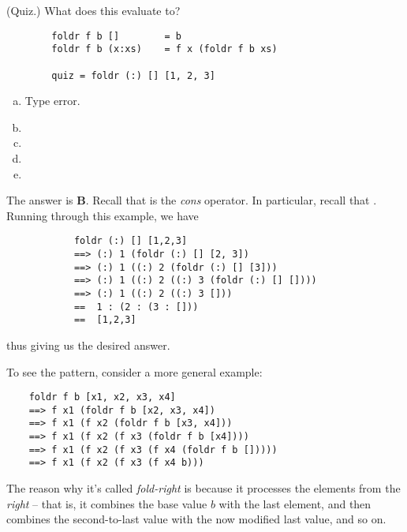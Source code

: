 \documentclass[letterpaper]{article}
\begin{document}
\begin{mdframed}[]
    (Quiz.) What does this evaluate to? 
    \begin{verbatim}
        foldr f b []        = b
        foldr f b (x:xs)    = f x (foldr f b xs)

        quiz = foldr (:) [] [1, 2, 3]\end{verbatim}   
        
    \begin{enumerate}[(a)]
        \item Type error.
        \item \code{[1, 2, 3]}
        \item \code{[3, 2, 1]}
        \item \code{[[3], [2], [1]]}
        \item \code{[[1], [2], [3]]}
    \end{enumerate}

    \begin{mdframed}[]
        The answer is \textbf{B}. Recall that \code{(:)} is the \emph{cons} operator. In particular, recall that . Running through this example, we have 
        \begin{verbatim}
            foldr (:) [] [1,2,3]
            ==> (:) 1 (foldr (:) [] [2, 3])
            ==> (:) 1 ((:) 2 (foldr (:) [] [3]))
            ==> (:) 1 ((:) 2 ((:) 3 (foldr (:) [] [])))
            ==> (:) 1 ((:) 2 ((:) 3 []))
            ==  1 : (2 : (3 : []))
            ==  [1,2,3]\end{verbatim}
        thus giving us the desired answer. 
    \end{mdframed}
\end{mdframed}

To see the pattern, consider a more general example: 
\begin{verbatim}
    foldr f b [x1, x2, x3, x4]
    ==> f x1 (foldr f b [x2, x3, x4])
    ==> f x1 (f x2 (foldr f b [x3, x4]))
    ==> f x1 (f x2 (f x3 (foldr f b [x4])))
    ==> f x1 (f x2 (f x3 (f x4 (foldr f b []))))
    ==> f x1 (f x2 (f x3 (f x4 b)))
\end{verbatim}
The reason why it's called \emph{fold-right} is because it processes the elements from the \emph{right} -- that is, it combines the base value $b$ with the last element, and then combines the second-to-last value with the now modified last value, and so on. 
\end{document}
